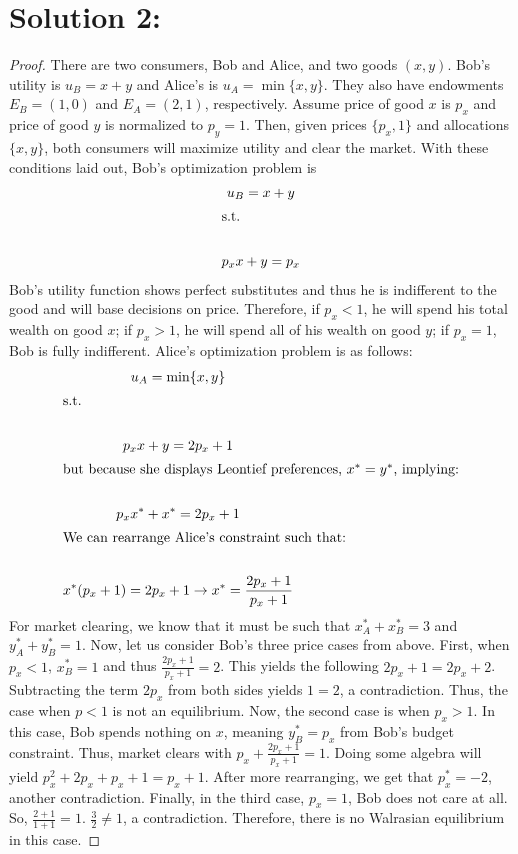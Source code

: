 \documentclass[10pt,a4paper]{article}
\begin{document}
\section*{Solution 2:}
  \begin{proof}
    There are two consumers, Bob and Alice, and two goods $(x,y)$. Bob's utility is $u_B = x+y$ and Alice's is $u_A = \min\{x,y\}$. They also have endowments $E_B = (1,0)$ and $E_A = (2,1)$, respectively. Assume price of good $x$ is $p_x$ and price of good $y$ is normalized to $p_y=1$. Then, given prices $\{p_x,1\}$ and allocations $\{x,y\}$, both consumers will maximize utility and clear the market. With these conditions laid out, Bob's optimization problem is 
    \begin{gather*}
      u_B = x+y \\
      \shortintertext{s.t.} \\
      p_xx + y = p_x \\
    \end{gather*} Bob's utility function shows perfect substitutes and thus he is indifferent to the good and will base decisions on price. Therefore, if $p_x<1$, he will spend his total wealth on good $x$; if $p_x>1$, he will spend all of his wealth on good $y$; if $p_x = 1$, Bob is fully indifferent. Alice's optimization problem is as follows:
    \begin{gather*}
      u_A = \min\{x,y\} \\
      \shortintertext{s.t.} \\
      p_xx + y = 2p_x + 1 \\
      \shortintertext{but because she displays Leontief preferences, $x^* = y^*$, implying:} \\
      p_xx^* + x^* = 2p_x+1 \\
      \shortintertext{We can rearrange Alice's constraint such that:} \\
      x^*(p_x+1) = 2p_x+1 \rightarrow x^* = \frac{2p_x + 1}{p_x + 1} \\
    \end{gather*} 
    For market clearing, we know that it must be such that $x_A^* + x_B^* = 3$ and $y_A^* + y_B^* = 1$. Now, let us consider Bob's three price cases from above. First, when $p_x<1$, $x^*_B = 1$ and thus $\frac{2p_x + 1}{p_x+1} = 2$. This yields the following $2p_x + 1 = 2p_x + 2$. Subtracting the term $2p_x$ from both sides yields $1=2$, a contradiction. Thus, the case when $p<1$ is not an equilibrium. Now, the second case is when $p_x>1$. In this case, Bob spends nothing on $x$, meaning $y^*_B = p_x$ from Bob's budget constraint. Thus, market clears with $p_x + \frac{2p_x + 1}{p_x + 1} = 1$. Doing some algebra will yield $p_x^2 + 2p_x + p_x + 1 = p_x + 1$. After more rearranging, we get that $p_x^* = -2$, another contradiction. Finally, in the third case, $p_x = 1$, Bob does not care at all. So, $\frac{2+1}{1+1} = 1$. $\frac{3}{2}\ne1$, a contradiction. Therefore, there is no Walrasian equilibrium in this case. 
  \end{proof}
\end{document}
